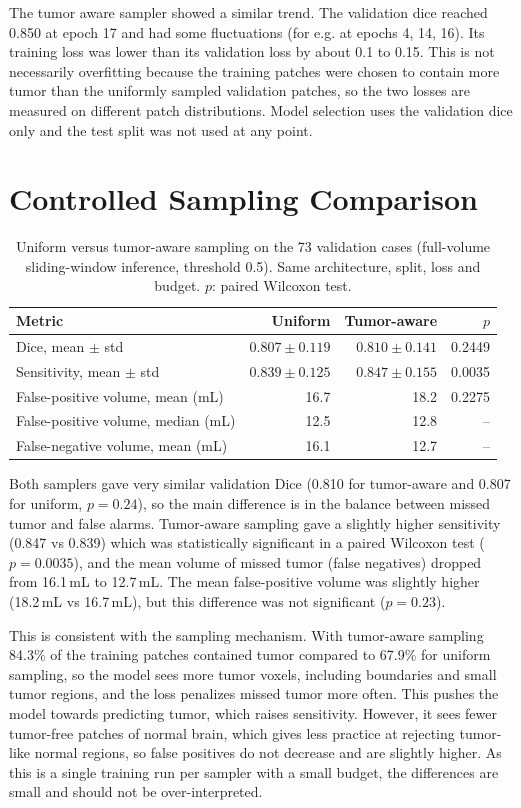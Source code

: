 \documentclass[10pt,a4paper]{article}
\begin{document}
The tumor aware sampler showed a similar trend. The validation dice reached 0.850 at epoch 17 and had some fluctuations (for e.g. at epochs 4, 14, 16). Its training loss was lower than its validation loss by about 0.1 to 0.15. This is not necessarily overfitting because the training patches were chosen to contain more tumor than the uniformly sampled validation patches, so the two losses are measured on different patch distributions. Model selection uses the validation dice only and the test split was not used at any point.

\section{Controlled Sampling Comparison}
\begin{table}[H]
\centering
\caption{Uniform versus tumor-aware sampling on the 73 validation cases (full-volume sliding-window inference, threshold 0.5). Same architecture, split, loss and budget. $p$: paired Wilcoxon test.}
\small
\begin{tabular}{lrrr}
\toprule
Metric & Uniform & Tumor-aware & $p$\\
\midrule
Dice, mean $\pm$ std & $0.807\pm0.119$ & $0.810\pm0.141$ & 0.2449\\
Sensitivity, mean $\pm$ std & $0.839\pm0.125$ & $0.847\pm0.155$ & 0.0035\\
False-positive volume, mean (mL) & 16.7 & 18.2 & 0.2275\\
False-positive volume, median (mL) & 12.5 & 12.8 & --\\
False-negative volume, mean (mL) & 16.1 & 12.7 & --\\
\bottomrule
\end{tabular}
\end{table}

Both samplers gave very similar validation Dice (0.810 for tumor-aware and 0.807 for uniform, $p=0.24$), so the main difference is in the balance between missed tumor and false alarms. Tumor-aware sampling gave a slightly higher sensitivity (0.847 vs 0.839) which was statistically significant in a paired Wilcoxon test ($p=0.0035$), and the mean volume of missed tumor (false negatives) dropped from 16.1\,mL to 12.7\,mL. The mean false-positive volume was slightly higher (18.2\,mL vs 16.7\,mL), but this difference was not significant ($p=0.23$).

This is consistent with the sampling mechanism. With tumor-aware sampling 84.3\% of the training patches contained tumor compared to 67.9\% for uniform sampling, so the model sees more tumor voxels, including boundaries and small tumor regions, and the loss penalizes missed tumor more often. This pushes the model towards predicting tumor, which raises sensitivity. However, it sees fewer tumor-free patches of normal brain, which gives less practice at rejecting tumor-like normal regions, so false positives do not decrease and are slightly higher. As this is a single training run per sampler with a small budget, the differences are small and should not be over-interpreted.
\end{document}
